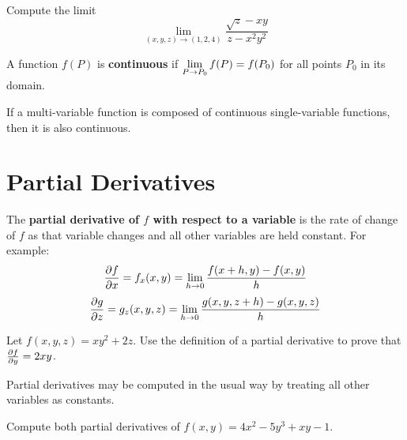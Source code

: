 \documentclass[letterpaper, twoside, 12pt]{book}
\begin{document}
          \begin{problem}
            Compute the limit
              \[
                \lim_{(x,y,z)\to(1,2,4)}
                \frac{\sqrt{z}-xy}{z-x^2y^2}
              \]
          \end{problem}

          \begin{solution}

          \end{solution}

\begin{definition}
  A function $f(P)$ is \textbf{continuous} if
  $\displaystyle \lim_{P\to P_0}f(P) = f(P_0)$ for all points $P_0$ in its domain.
\end{definition}

\begin{theorem}
  If a multi-variable function is composed of continuous single-variable
  functions, then it is also continuous.
\end{theorem}


\section{Partial Derivatives} %

\begin{definition}
  The \textbf{partial derivative of $f$ with respect to a variable} is
  the rate of change of $f$ as that variable changes and all other variables
  are held constant. For example:
  \[\frac{\partial f}{\partial x}=f_x(x,y)=\lim_{h\to0}\frac{f(x+h,y)-f(x,y)}{h}\]
  \[\frac{\partial g}{\partial z}=g_z(x,y,z)=\lim_{h\to0}\frac{g(x,y,z+h)-g(x,y,z)}{h}\]
\end{definition}

          \begin{problem}
            Let $f(x,y,z)=xy^2+2z$.
            Use the definition of a partial derivative to prove that
            $\frac{\partial f}{\partial y} = 2xy$.
          \end{problem}

          \begin{solution}

          \end{solution}

\begin{theorem}
  Partial derivatives may be computed in the usual way by treating
  all other variables as constants.
\end{theorem}

          \begin{problem}
            Compute both partial derivatives of $f(x,y)=4x^2-5y^3+xy-1$.
          \end{problem}
\end{document}
